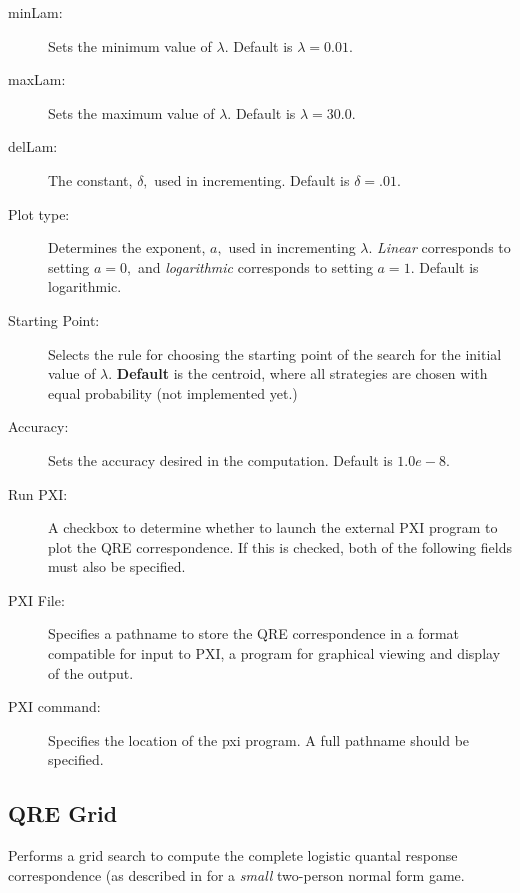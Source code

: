 \documentclass[12pt]{report}
\begin{document}
\begin{description}
\item[minLam:] Sets the minimum value of $\lambda.$ 
Default is $\lambda = 0.01$.
\item[maxLam:] Sets the maximum value of $\lambda.$  Default is 
$\lambda = 30.0.$
\item[delLam:]  The constant, $\delta,$ used in incrementing.   Default is 
$\delta = .01.$
\item[Plot type:] Determines the exponent, $a,$ used in incrementing 
$\lambda.$  {\em Linear} corresponds to setting $a = 0,$ and {\em 
logarithmic} corresponds to setting $a = 1.$ Default is logarithmic.
\item[Starting Point:] Selects the rule for choosing the starting
point of the search for the initial value of $\lambda.$ {\bf Default} 
is the centroid, where all strategies are chosen with equal
probability (not implemented yet.)
\item[Accuracy:] Sets the accuracy desired in the computation.
Default is $1.0e-8.$ 
\item[Run PXI:] A checkbox to determine whether to launch the external
PXI program to plot the QRE correspondence.  If this is checked, both
of the following fields must also be specified.
\item[PXI File:] Specifies a pathname to store the QRE correspondence
in a format compatible for input to PXI, a program for graphical
viewing and display of the output.
\item[PXI command:] Specifies the location of the pxi program.  A full
pathname should be specified.
\end{description}

\subsection{QRE Grid}\label{QREAll}
Performs a grid search to compute the complete logistic
quantal response correspondence (as described in \cite{McKPal:95a}
for a {\em small} two-person normal form game.
\end{document}
